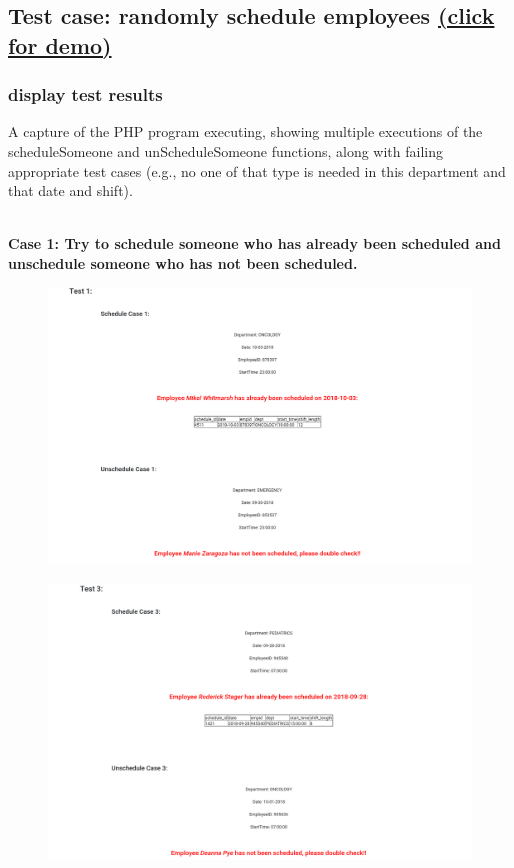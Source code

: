 \documentclass[11pt]{article}
\makeatletter
\def\maxwidth{\ifdim\Gin@nat@width>\linewidth\linewidth
    \else\Gin@nat@width\fi}
\let\Oldincludegraphics\includegraphics
\renewcommand{\includegraphics}[1]{\Oldincludegraphics[width=.8\maxwidth]{#1}}
\makeatother
\begin{document}
\newpage

    \subsection*{\texorpdfstring{Test case: randomly schedule employees
\href{http://cs431project-jxy225.herokuapp.com/view/test.php}{(click for
demo)}}{Test cases(randomly schedule employees) click for demo}}\label{test-casesrandomly-schedule-employees-click-for-demo}

    \subsubsection*{display test results}\label{display-test-results}

    A capture of the PHP program executing, showing multiple executions of
the scheduleSomeone and unScheduleSomeone functions, along with failing
appropriate test cases (e.g., no one of that type is needed in this
department and that date and shift).\\\

\noindent    \textbf{Case 1: Try to schedule someone who has already been scheduled and  unschedule someone who has not been scheduled.}

\begin{figure}[H]
        \centering
        \includegraphics{4.png}
        \caption{}
    \end{figure}

\begin{figure}[H]
        \centering
        \includegraphics{6.png}
        \caption{}
    \end{figure}
\end{document}
